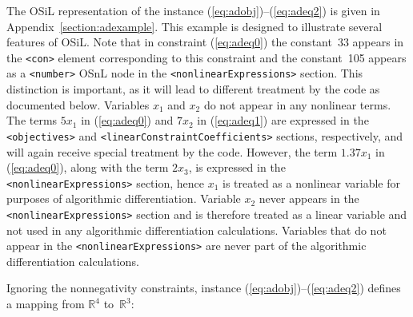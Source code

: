 \documentclass[11pt]{article}
\renewcommand{\_}{{\char"5F}}
\renewcommand{\{}{{\char"7B}}
\renewcommand{\}}{{\char"7D}}
\renewcommand{\^}{{\char"0D}}
\renewcommand{\'}{{\char"0D}}
\begin{document}
\begin{enumerate}[Step 1:]
The OSiL representation of the instance  (\ref{eq:adobj})--(\ref{eq:adeq2}) is given in Appendix~\ref{section:adexample}.
This example is designed to illustrate several features of OSiL. Note that in constraint  (\ref{eq:adeq0}) the
constant~33 appears in the {\tt <con>} element corresponding to this constraint
and the constant~105 appears as a {\tt <number>} OSnL node in the {\tt <nonlinearExpressions>} section.
This distinction is important, as it will lead to different treatment by the code as documented below.
Variables $x_{1}$ and $x_{2}$  do not appear in any nonlinear terms.
The terms $5x_{1}$ in  (\ref{eq:adeq0}) and $7 x_{2}$ in (\ref{eq:adeq1}) are expressed in the
{\tt <objectives>} and {\tt <linearConstraintCoefficients>} sections, respectively, and will again
receive special treatment by the code. However, the term $1.37x_1$ in (\ref{eq:adeq0}),
along with the term $2x_3$, is expressed in the {\tt <nonlinearExpressions>} section,
hence $x_1$  is treated as a nonlinear variable for purposes of algorithmic differentiation.
Variable $x_{2}$ never appears in the  {\tt <nonlinearExpressions>} section and is therefore treated as a linear variable and not used  in any algorithmic differentiation calculations.
Variables that do not appear in the {\tt <nonlinearExpressions>} are never part of the algorithmic differentiation calculations.

Ignoring the nonnegativity constraints, instance (\ref{eq:adobj})--(\ref{eq:adeq2})  defines a mapping  
from $ \mathbb{R}^{4}$ to~$\mathbb{R}^{3}$:





\end{enumerate}
\end{document}
